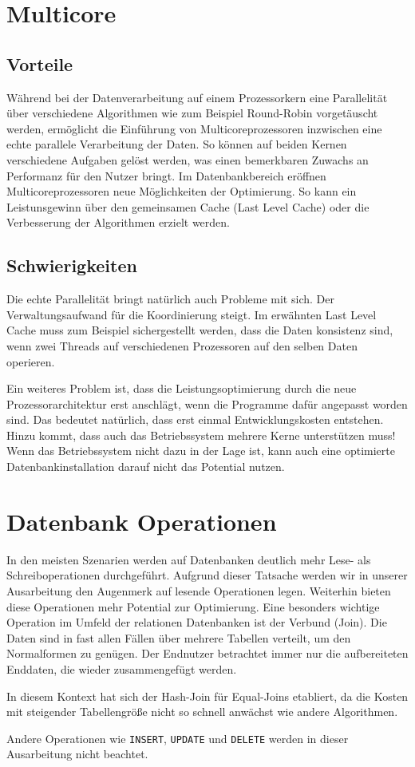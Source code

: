 \section{Multicore}
\label{sec:Multicore}

\subsection*{Vorteile}
\label{sec:Multicore_Vorteile}

Während bei der Datenverarbeitung auf einem Prozessorkern eine Parallelität über verschiedene Algorithmen wie zum Beispiel Round-Robin vorgetäuscht werden, ermöglicht die Einführung von Multicoreprozessoren inzwischen eine echte parallele Verarbeitung der Daten. So können auf beiden Kernen verschiedene Aufgaben gelöst werden, was einen bemerkbaren Zuwachs an Performanz für den Nutzer bringt. Im Datenbankbereich eröffnen Multicoreprozessoren neue Möglichkeiten der Optimierung. So kann ein Leistunsgewinn über den gemeinsamen Cache (Last Level Cache) oder die Verbesserung der Algorithmen erzielt werden.

\subsection*{Schwierigkeiten}
\label{sec:Multicore_Schwierigkeiten}
Die echte Parallelität bringt natürlich auch Probleme mit sich. Der Verwaltungsaufwand für die Koordinierung steigt. Im erwähnten Last Level Cache muss zum Beispiel sichergestellt werden, dass 
die Daten konsistenz sind, wenn zwei Threads auf verschiedenen Prozessoren auf den selben Daten operieren. 

Ein weiteres Problem ist, dass die Leistungsoptimierung durch die neue Prozessorarchitektur erst anschlägt, wenn die Programme dafür angepasst worden sind. Das bedeutet natürlich, dass erst einmal Entwicklungskosten entstehen. Hinzu kommt, dass auch das Betriebssystem mehrere Kerne unterstützen muss! Wenn das Betriebssystem nicht dazu in der Lage ist, kann auch eine optimierte Datenbankinstallation darauf nicht das Potential nutzen.

\section{Datenbank Operationen}
\label{sec:Operationen}
In den meisten Szenarien werden auf Datenbanken deutlich mehr Lese- als Schreiboperationen durchgeführt. Aufgrund dieser Tatsache werden wir in unserer Ausarbeitung den Augenmerk auf lesende Operationen legen. Weiterhin bieten diese Operationen mehr Potential zur Optimierung. Eine besonders wichtige Operation im Umfeld der relationen Datenbanken ist der Verbund (Join). Die Daten sind in fast allen Fällen über mehrere Tabellen verteilt, um den Normalformen zu genügen. Der Endnutzer betrachtet immer nur die aufbereiteten Enddaten, die wieder zusammengefügt werden.

In diesem Kontext hat sich der Hash-Join für Equal-Joins etabliert, da die Kosten mit steigender Tabellengröße nicht so schnell anwächst wie andere Algorithmen. 

Andere Operationen wie \texttt{INSERT}, \texttt{UPDATE} und \texttt{DELETE} werden in dieser Ausarbeitung nicht beachtet.
